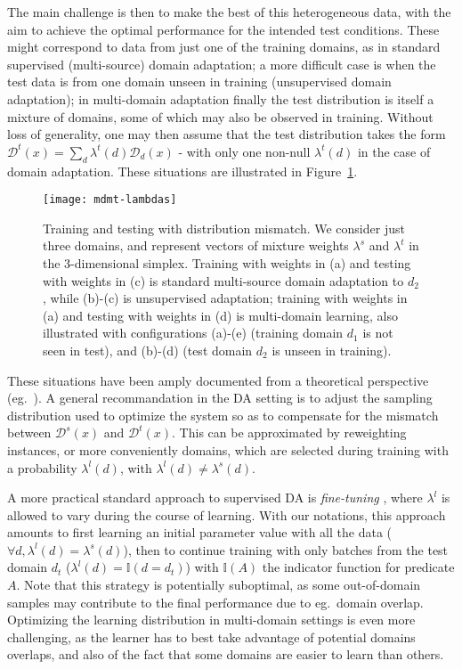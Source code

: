 \documentclass[11pt,a4paper]{article}
\newcommand{\fyTodo}[1]{\Todo[FY:]{\textcolor{orange}{#1}}}
\newcommand{\indic}[1]{\ensuremath{\mathbb{I}(#1)}}
\begin{document}
The main challenge is then to make the best of this heterogeneous data, with the aim to achieve the optimal performance for the intended test conditions. These might correspond to data from just one of the training domains, as in standard supervised (multi-source) domain adaptation; a more difficult case is when the test data is from one domain unseen in training (unsupervised domain adaptation); in multi-domain adaptation finally the test distribution is itself a mixture of domains, some of which may also be observed in training.  Without loss of generality, one may then assume that the test distribution takes the form $\mathcal{D}^{t}(x) = \sum_d \lambda^{t}(d) \mathcal{D}_d(x)$ - with only one non-null  $\lambda^{t}(d)$ in the case of domain adaptation.
These situations are illustrated in Figure~\ref{fig:mdmt-lambdas}.
\begin{figure}[h]
  \centering
  \texttt{[image: mdmt-lambdas]}
  \caption{Training and testing with distribution mismatch. We consider just three domains, and represent vectors of mixture weights $\lambda^{s}$ and $\lambda^{t}$ in the 3-dimensional simplex. Training with weights in (a) and testing with weights in (c) is standard multi-source domain adaptation to $d_2$, while (b)-(c) is unsupervised adaptation; training with weights in (a) and testing with weights in (d) is multi-domain learning, also illustrated with configurations (a)-(e) (training domain $d_1$ is not seen in test), and (b)-(d)  (test domain $d_2$ is unseen in training).}\label{fig:mdmt-lambdas}
\end{figure}

These situations have been amply documented from a theoretical perspective (eg.\ \cite{Mansour09multiple,Mansour09domainadaptation,Hoffman18algorithms}). A general recommandation in the DA setting  is to adjust the sampling distribution used to optimize the system so as to compensate for the mismatch between $\mathcal{D}^s(x)$ and $\mathcal{D}^t(x)$. This can be approximated by reweighting instances, or more conveniently domains, which are selected during training with a probability $\lambda^{l}(d)$, with $\lambda^{l}(d) \neq \lambda^{s}(d)$.

A more practical standard approach to supervised DA is \emph{fine-tuning} \cite{Luong15stanford,Freitag16fast}, where $\lambda^{l}$ is allowed to vary during the course of learning. With our notations, this approach amounts to first learning an initial parameter value with all the data ($\forall d, \lambda^{l}(d) = \lambda^{s}(d)$), then to continue training with only batches from the test domain $d_t$ ($\lambda^{l}(d) = \indic{d = d_t}$) with $\indic{A}$ the indicator function for predicate $A$. Note that this strategy is potentially suboptimal, as some out-of-domain samples may contribute to the final performance due to eg.\ domain overlap. Optimizing the learning distribution in multi-domain settings is even more challenging, as the learner has to best take advantage of potential domains overlaps, and also of the fact that some domains are easier to learn than others.\fyTodo{How to measure this?} 
\end{document}
